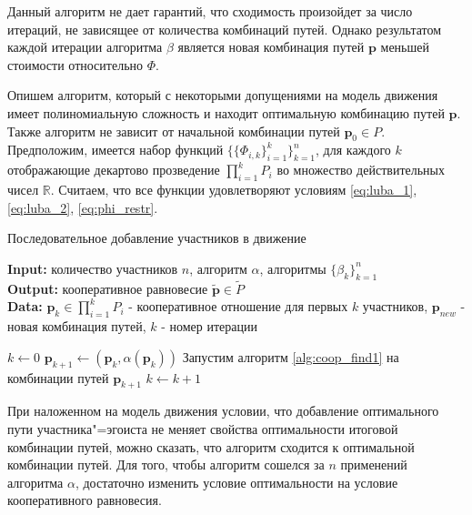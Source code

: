 \documentclass[12pt, a4paper]{article}
\begin{document}
Данный алгоритм не дает гарантий, что сходимость произойдет за число итераций, не зависящее от количества комбинаций путей. Однако результатом каждой итерации алгоритма $\beta$ является новая комбинация путей $\textbf{p}$ меньшей стоимости относительно $\Phi$. 

Опишем алгоритм, который с некоторыми допущениями на модель движения имеет полиномиальную сложность и находит оптимальную комбинацию путей $\textbf{p}$.
Также алгоритм не зависит от начальной комбинации путей $\textbf{p}_0 \in P$. Предположим, имеется набор функций $\{\{\Phi_{i, k} \}_{i = 1}^k\}_{k = 1}^n$, для каждого $k$ отображающие декартово прозведение $\prod\limits_{i = 1}^kP_i$ во множество действительных чисел $\mathbb{R}$. Считаем, что все функции удовлетворяют условиям \eqref{eq:luba_1}, \eqref{eq:luba_2}, \eqref{eq:phi_restr}.


\begin{algorithm}[H]
	\caption{Последовательное добавление участников в движение}
	\label{alg:coop_find2}
	{\bf {Input:}} количество участников $n$, алгоритм $\alpha$, алгоритмы $\{\beta_k\}_{k = 1}^n$\\
	{\bf {Output:}} кооперативное равновесие $\widetilde{\textbf{p}} \in \widetilde{P}$\\
	{\bf {Data:}} $\textbf{p}_{k} \in \prod\limits_{i = 1}^kP_i$ - кооперативное отношение для первых $k$ участников, $\textbf{p}_{new}$ - новая комбинация путей, $k$ - номер итерации
	\begin{algorithmic}[1]
		\State $k \gets 0$
		\State $\textbf{p}_{k + 1} \gets (\textbf{p}_{k}, \alpha (\textbf{p}_{k}))$
		\State Запустим алгоритм \ref {alg:coop_find1} на комбинации путей $\textbf{p}_{k + 1}$
		\State $k \gets k + 1$
		\EndWhile
	\end{algorithmic}
\end{algorithm}

При наложенном на модель движения условии, что добавление оптимального пути участника"=эгоиста не меняет свойства оптимальности итоговой комбинации путей, можно сказать, что алгоритм сходится к оптимальной комбинации путей. Для того, чтобы алгоритм сошелся за $n$ применений алгоритма $\alpha$, достаточно изменить условие оптимальности на условие кооперативного равновесия.

\end{document}
